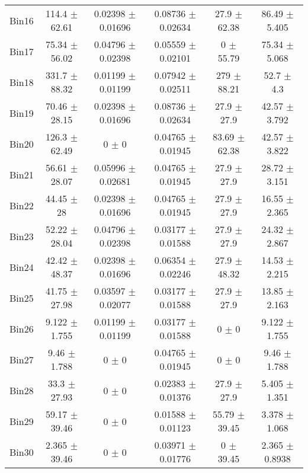 \begin{tabular}{@{\extracolsep{4pt}}lccccc@{}}
     Bin16 & 114.4 $\pm$ 62.61 & 0.02398 $\pm$ 0.01696 & 0.08736 $\pm$ 0.02634 & 27.9 $\pm$ 62.38 & 86.49 $\pm$ 5.405 \\ 
     Bin17 & 75.34 $\pm$ 56.02 & 0.04796 $\pm$ 0.02398 & 0.05559 $\pm$ 0.02101 & 0 $\pm$ 55.79 & 75.34 $\pm$ 5.068 \\ 
     Bin18 & 331.7 $\pm$ 88.32 & 0.01199 $\pm$ 0.01199 & 0.07942 $\pm$ 0.02511 & 279 $\pm$ 88.21 & 52.7 $\pm$ 4.3 \\ 
     Bin19 & 70.46 $\pm$ 28.15 & 0.02398 $\pm$ 0.01696 & 0.08736 $\pm$ 0.02634 & 27.9 $\pm$ 27.9 & 42.57 $\pm$ 3.792 \\ 
     Bin20 & 126.3 $\pm$ 62.49 & 0 $\pm$ 0 & 0.04765 $\pm$ 0.01945 & 83.69 $\pm$ 62.38 & 42.57 $\pm$ 3.822 \\ 
     Bin21 & 56.61 $\pm$ 28.07 & 0.05996 $\pm$ 0.02681 & 0.04765 $\pm$ 0.01945 & 27.9 $\pm$ 27.9 & 28.72 $\pm$ 3.151 \\ 
     Bin22 & 44.45 $\pm$ 28 & 0.02398 $\pm$ 0.01696 & 0.04765 $\pm$ 0.01945 & 27.9 $\pm$ 27.9 & 16.55 $\pm$ 2.365 \\ 
     Bin23 & 52.22 $\pm$ 28.04 & 0.04796 $\pm$ 0.02398 & 0.03177 $\pm$ 0.01588 & 27.9 $\pm$ 27.9 & 24.32 $\pm$ 2.867 \\ 
     Bin24 & 42.42 $\pm$ 48.37 & 0.02398 $\pm$ 0.01696 & 0.06354 $\pm$ 0.02246 & 27.9 $\pm$ 48.32 & 14.53 $\pm$ 2.215 \\ 
     Bin25 & 41.75 $\pm$ 27.98 & 0.03597 $\pm$ 0.02077 & 0.03177 $\pm$ 0.01588 & 27.9 $\pm$ 27.9 & 13.85 $\pm$ 2.163 \\ 
     Bin26 & 9.122 $\pm$ 1.755 & 0.01199 $\pm$ 0.01199 & 0.03177 $\pm$ 0.01588 & 0 $\pm$ 0 & 9.122 $\pm$ 1.755 \\ 
     Bin27 & 9.46 $\pm$ 1.788 & 0 $\pm$ 0 & 0.04765 $\pm$ 0.01945 & 0 $\pm$ 0 & 9.46 $\pm$ 1.788 \\ 
     Bin28 & 33.3 $\pm$ 27.93 & 0 $\pm$ 0 & 0.02383 $\pm$ 0.01376 & 27.9 $\pm$ 27.9 & 5.405 $\pm$ 1.351 \\ 
     Bin29 & 59.17 $\pm$ 39.46 & 0 $\pm$ 0 & 0.01588 $\pm$ 0.01123 & 55.79 $\pm$ 39.45 & 3.378 $\pm$ 1.068 \\ 
     Bin30 & 2.365 $\pm$ 39.46 & 0 $\pm$ 0 & 0.03971 $\pm$ 0.01776 & 0 $\pm$ 39.45 & 2.365 $\pm$ 0.8938 \\ 
\hline\hline
  \end{tabular}
